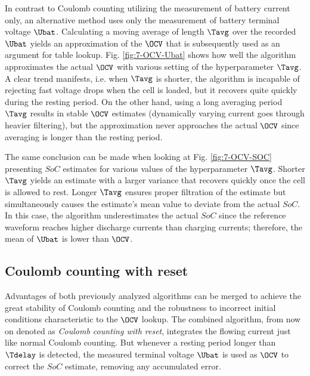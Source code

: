In contrast to Coulomb counting utilizing the measurement of battery current only, an alternative method uses only the measurement of battery terminal voltage $\Ubat$. Calculating a moving average of length $\Tavg$ over the recorded $\Ubat$ yields an approximation of the $\OCV$ that is subsequently used as an argument for table lookup.
Fig. \ref{fig:7-OCV-Ubat} shows how well the algorithm approximates the actual $\OCV$ with various setting of the hyperparameter $\Tavg$. A clear trend manifests, i.e. when $\Tavg$ is shorter, the algorithm is incapable of rejecting fast voltage drops when the cell is loaded, but it recovers quite quickly during the resting period. On the other hand, using a long averaging period $\Tavg$ results in stable $\OCV$ estimates (dynamically varying current goes through heavier filtering), but the approximation never approaches the actual $\OCV$ since averaging is longer than the resting period.

The same conclusion can be made when looking at Fig. \ref{fig:7-OCV-SOC} presenting $SoC$ estimates for various values of the hyperparameter $\Tavg$. Shorter $\Tavg$ yields an estimate with a larger variance that recovers quickly once the cell is allowed to rest. Longer $\Tavg$ ensures proper filtration of the estimate but simultaneously causes the estimate's mean value to deviate from the actual $SoC$. In this case, the algorithm underestimates the actual $SoC$ since the reference waveform reaches higher discharge currents than charging currents; therefore, the mean of $\Ubat$ is lower than $\OCV$.





\subsection{Coulomb counting with reset}
\label{sec:7-ccr}

Advantages of both previously analyzed algorithms can be merged to achieve the great stability of Coulomb counting and the robustness to incorrect initial conditions characteristic to the $\OCV$ lookup. The combined algorithm, from now on denoted as \textit{Coulomb counting with reset}, integrates the flowing current just like normal Coulomb counting. But whenever a resting period longer than $\Tdelay$ is detected, the measured terminal voltage $\Ubat$ is used as $\OCV$ to correct the $SoC$ estimate, removing any accumulated error.


